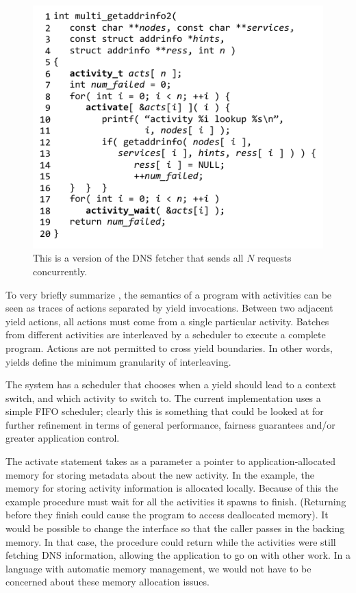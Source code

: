 \documentclass[9pt,preprint]{sigplanconf}
\begin{document}
\begin{figure}
\includegraphics{multi_getaddrinfo_conc}
\caption{This is a \charcoal{} version of the DNS fetcher that sends all $N$ requests concurrently.}
\label{fig:charcoal_multidns_conc}
\end{figure}

To very briefly summarize \cite{Abadi2009}, the semantics of a program with activities can be seen as traces of actions separated by yield invocations.
Between two adjacent yield actions, all actions must come from a single particular activity.
Batches from different activities are interleaved by a scheduler to execute a complete program.
Actions are not permitted to cross yield boundaries.
In other words, yields define the minimum granularity of interleaving.

The system has a scheduler that chooses when a yield should lead to a context switch, and which activity to switch to.
The current \charcoal{} implementation uses a simple FIFO scheduler; clearly this is something that could be looked at for further refinement in terms of general performance, fairness guarantees and/or greater application control.

The activate statement takes as a parameter a pointer to application-allocated memory for storing metadata about the new activity.
In the example, the memory for storing activity information is allocated locally.
Because of this the example procedure must wait for all the activities it spawns to finish.
(Returning before they finish could cause the program to access deallocated memory).
It would be possible to change the interface so that the caller passes in the backing memory.
In that case, the procedure could return while the activities were still fetching DNS information, allowing the application to go on with other work.
In a language with automatic memory management, we would not have to be concerned about these memory allocation issues.
\end{document}
